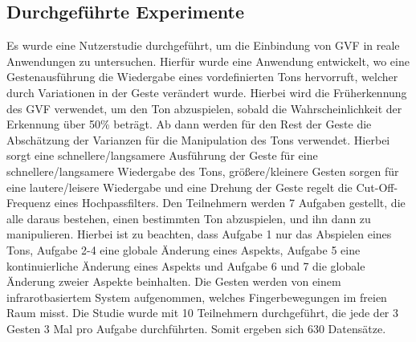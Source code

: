 \documentclass{llncs}
\begin{document}
\subsection{Durchgeführte Experimente}
Es wurde eine Nutzerstudie durchgeführt, um die Einbindung von GVF in reale Anwendungen zu untersuchen. Hierfür wurde eine Anwendung entwickelt, wo eine Gestenausführung die Wiedergabe eines vordefinierten Tons hervorruft, welcher durch Variationen in der Geste verändert wurde. Hierbei wird die Früherkennung des GVF verwendet, um den Ton abzuspielen, sobald die Wahrscheinlichkeit der Erkennung über 50\% beträgt. Ab dann werden für den Rest der Geste die Abschätzung der Varianzen für die Manipulation des Tons verwendet. Hierbei sorgt eine schnellere/langsamere Ausführung der Geste für eine schnellere/langsamere Wiedergabe des Tons, größere/kleinere Gesten sorgen für eine lautere/leisere Wiedergabe und eine Drehung der Geste regelt die Cut-Off-Frequenz eines Hochpassfilters. Den Teilnehmern werden 7 Aufgaben gestellt, die alle daraus bestehen, einen bestimmten Ton abzuspielen, und ihn dann zu manipulieren. Hierbei ist zu beachten, dass Aufgabe 1 nur das Abspielen eines Tons, Aufgabe 2-4 eine globale Änderung eines Aspekts, Aufgabe 5 eine kontinuierliche Änderung eines Aspekts und Aufgabe 6 und 7 die globale Änderung zweier Aspekte beinhalten. Die Gesten werden von einem infrarotbasiertem System aufgenommen, welches Fingerbewegungen im freien Raum misst. Die Studie wurde mit 10 Teilnehmern durchgeführt, die jede der 3 Gesten 3 Mal pro Aufgabe durchführten. Somit ergeben sich 630 Datensätze.
 


\end{document}
